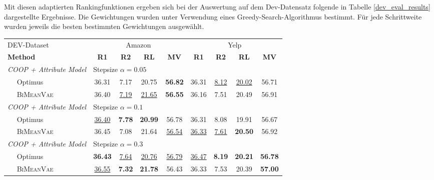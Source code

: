 Mit diesen adaptierten Rankingfunktionen ergeben sich bei der Auswertung auf dem Dev-Datensatz folgende in Tabelle \ref{dev_eval_results} dargestellte Ergebnisse.
Die Gewichtungen wurden unter Verwendung eines Greedy-Search-Algorithmus bestimmt.
Für jede Schrittweite wurden jeweils die besten bestimmten Gewichtungen ausgewählt.


\begin{table}[!h]
    
    \centering
    \begin{tabular}{@{}lcccc|cccc@{}}
    \toprule
    DEV-Dataset                    & \multicolumn{4}{c}{Amazon} & \multicolumn{4}{c}{Yelp} \\ 
    \textbf{Method} & \textbf{R1} & \textbf{R2} & \textbf{RL} & \textbf{MV} & \textbf{R1} & \textbf{R2} & \textbf{RL} & \textbf{MV}\\ \midrule 
    
    \textit{COOP + Attribute Model}        &      \multicolumn{3}{l}{Stepsize $\alpha= 0.05$}             &        &   & &     \\
    $\quad$ Optimus          &  36.31 & 7.17& 20.75&\textbf{56.82} &  36.31   &   \underline{8.12}   & \underline{20.02}  &  56.71    \\ 
    $\quad$ \textsc{BiMeanVae} & 36.40 & \underline{7.19} & \underline{21.65} & \textbf{56.55} &36.16 &7.51 &20.49 & 56.91\\ [0.2cm] %
    
    \textit{COOP + Attribute Model}        &         \multicolumn{3}{l}{Stepsize $\alpha= 0.1$}            &        &   & &     \\
    $\quad$ Optimus            & \underline{36.40}  & \textbf{7.78}&\textbf{20.99} &56.78 &   36.31  &  8.08    &  19.91 & 56.67  \\ 
    $\quad$ \textsc{BiMeanVae}& 36.45 & 7.08 & 21.64 & \underline{56.54} & \underline{36.33}&\underline{7.61} & \textbf{20.50} &56.92 \\[0.2cm]  %


    \textit{COOP + Attribute Model}        &      \multicolumn{3}{l}{Stepsize $\alpha= 0.3$}                &        &        &   & &     \\
    $\quad$ Optimus            & \textbf{36.43}  & \underline{7.64}& \underline{20.76} &\underline{56.79} &   \underline{36.47}  &    \textbf{8.19}  & \textbf{20.21}  & \textbf{56.78}  \\ 
    $\quad$ \textsc{BiMeanVae} & \underline{36.55} & \textbf{7.32} & \textbf{21.78} & 56.43 & 36.33 & 7.53 & 20.39& \textbf{57.00}\\[0.2cm] %



\end{tabular}
\end{table}
